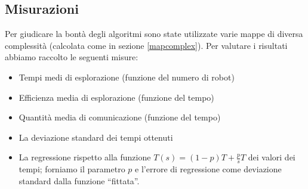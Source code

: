 \subsection{Misurazioni}
Per giudicare la bontà degli algoritmi sono state utilizzate varie mappe di 
diversa complessità (calcolata come in sezione \ref{mapcomplex}).
Per valutare i risultati abbiamo raccolto le seguenti misure:

\begin{itemize}
    \item Tempi medi di esplorazione (funzione del numero di robot)
    \item Efficienza media di esplorazione (funzione del tempo)
    \item Quantità media di comunicazione (funzione del tempo)
    \item La deviazione standard dei tempi ottenuti
    \item La regressione rispetto alla funzione $T(s) = (1-p)T + \frac{p}{s}T$
          dei valori dei tempi; forniamo il parametro $p$ e l'errore
          di regressione come deviazione standard dalla funzione ``fittata''.
\end{itemize}
\newcommand{\mapComplexity}[0]{}
\newcommand{\mapDescription}[0]{}
\newcommand{\nomeMappa}[0]{}
\newcommand{\pSimpleFit}[0]{}
\newcommand{\pAstarFit}[0]{}
\newcommand{\errSimpleFit}[0]{}
\newcommand{\errAstarFit}[0]{}


